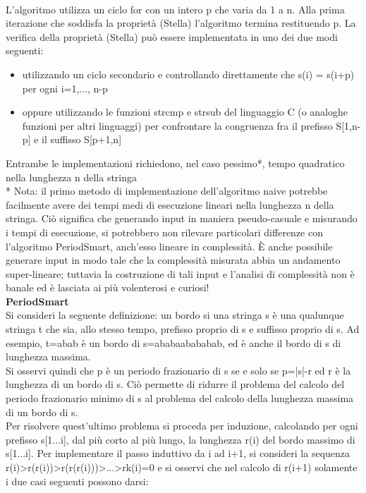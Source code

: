\\L'algoritmo utilizza un ciclo for con un intero p che varia da 1 a n. Alla prima iterazione che soddisfa la proprietà (Stella) l'algoritmo termina restituendo p.
La verifica della proprietà (Stella) può essere implementata in uno dei due modi seguenti:
\begin{itemize}
    \item utilizzando un ciclo secondario e controllando direttamente che s(i) = s(i+p) per ogni i=1,..., n-p
    \item oppure utilizzando le funzioni strcmp e strsub del linguaggio C (o analoghe funzioni per altri linguaggi) per confrontare la congruenza fra il prefisso S[1,n-p] e il suffisso S[p+1,n]
\end{itemize}
Entrambe le implementazioni richiedono, nel caso pessimo*, tempo quadratico nella lunghezza n della stringa
\pagebreak
\\* Nota: il primo metodo di implementazione dell'algoritmo naive potrebbe facilmente avere dei tempi medi di esecuzione lineari nella lunghezza n della stringa. Ciò significa che generando input in maniera pseudo-casuale e misurando i tempi di esecuzione, si potrebbero non rilevare particolari differenze con l'algoritmo PeriodSmart, anch'esso lineare in complessità. È anche possibile generare input in modo tale che la complessità misurata abbia un andamento super-lineare; tuttavia la costruzione di tali input e l'analisi di complessità non è banale ed è lasciata ai più volenterosi e curiosi!
\vspace{3mm}\\
\textbf{PeriodSmart}
\\Si consideri la seguente definizione: un bordo si una stringa s è una qualunque stringa t che sia, allo stesso tempo, prefisso proprio di s e suffisso proprio di s. Ad esempio, t=abab è un bordo di s=ababaabababab, ed è anche il bordo di s di lunghezza massima.
\vspace{3mm}
\\Si osservi quindi che p è un periodo frazionario di s se e solo se p=|s|-r ed r è la lunghezza di un bordo di s. Ciò permette di ridurre il problema del calcolo del periodo frazionario minimo di s al problema del calcolo della lunghezza massima di un bordo di s.\\
Per risolvere quest'ultimo problema si proceda per induzione, calcolando per ogni prefisso s[1...i], dal più corto al più lungo, la lunghezza r(i) del bordo massimo di s[1...i]. Per implementare il passo induttivo da i ad i+1, si consideri la sequenza r(i)>r(r(i))>r(r(r(i)))>...>rk(i)=0 e si osservi che nel calcolo di r(i+1) solamente i due casi seguenti possono darsi:
